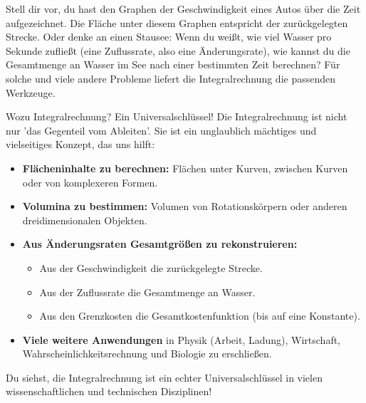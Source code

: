 Stell dir vor, du hast den Graphen der Geschwindigkeit eines Autos über die Zeit aufgezeichnet. Die Fläche unter diesem Graphen entspricht der zurückgelegten Strecke. Oder denke an einen Stausee: Wenn du weißt, wie viel Wasser pro Sekunde zufließt (eine Zuflussrate, also eine Änderungsrate), wie kannst du die Gesamtmenge an Wasser im See nach einer bestimmten Zeit berechnen? Für solche und viele andere Probleme liefert die Integralrechnung die passenden Werkzeuge.

\begin{infoboxumgebung}{Wozu Integralrechnung? Ein Universalschlüssel!}
Die Integralrechnung ist nicht nur 'das Gegenteil vom Ableiten'. Sie ist ein unglaublich mächtiges und vielseitiges Konzept, das uns hilft:
\begin{itemize}
    \item \textbf{Flächeninhalte zu berechnen:} Flächen unter Kurven, zwischen Kurven oder von komplexeren Formen.
    \item \textbf{Volumina zu bestimmen:} Volumen von Rotationskörpern oder anderen dreidimensionalen Objekten.
    \item \textbf{Aus Änderungsraten Gesamtgrößen zu rekonstruieren:}
        \begin{itemize}
            \item Aus der Geschwindigkeit die zurückgelegte Strecke.
            \item Aus der Zuflussrate die Gesamtmenge an Wasser.
            \item Aus den Grenzkosten die Gesamtkostenfunktion (bis auf eine Konstante).
        \end{itemize}
    \item \textbf{Viele weitere Anwendungen} in Physik (Arbeit, Ladung), Wirtschaft, Wahrscheinlichkeitsrechnung und Biologie zu erschließen.
\end{itemize}
Du siehst, die Integralrechnung ist ein echter Universalschlüssel in vielen wissenschaftlichen und technischen Disziplinen!
\end{infoboxumgebung}


